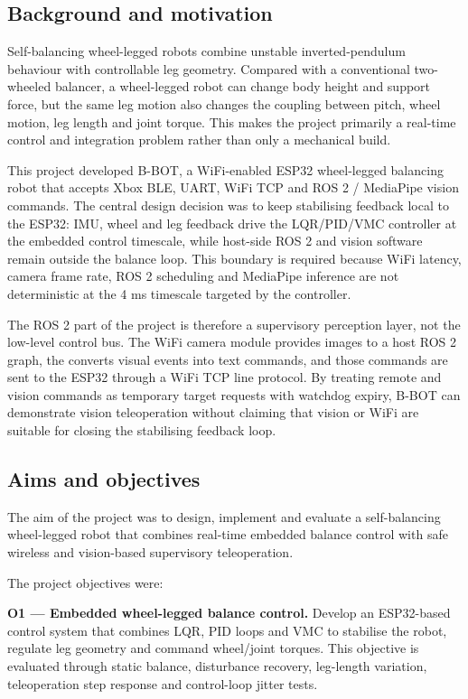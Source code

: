 \documentclass[12pt, a4paper]{article}
\begin{document}
\subsection{Background and motivation}

Self-balancing wheel-legged robots combine unstable inverted-pendulum behaviour with controllable leg geometry. Compared with a conventional two-wheeled balancer, a wheel-legged robot can change body height and support force, but the same leg motion also changes the coupling between pitch, wheel motion, leg length and joint torque. This makes the project primarily a real-time control and integration problem rather than only a mechanical build.

This project developed B-BOT, a WiFi-enabled ESP32 wheel-legged balancing robot that accepts Xbox BLE, UART, WiFi TCP and ROS 2 / MediaPipe vision commands. The central design decision was to keep stabilising feedback local to the ESP32: IMU, wheel and leg feedback drive the LQR/PID/VMC controller at the embedded control timescale, while host-side ROS 2 and vision software remain outside the balance loop. This boundary is required because WiFi latency, camera frame rate, ROS 2 scheduling and MediaPipe inference are not deterministic at the 4 ms timescale targeted by the controller.

The ROS 2 part of the project is therefore a supervisory perception layer, not the low-level control bus. The WiFi camera module provides images to a host ROS 2 graph, the \texttt{} converts visual events into text commands, and those commands are sent to the ESP32 through a WiFi TCP line protocol. By treating remote and vision commands as temporary target requests with watchdog expiry, B-BOT can demonstrate vision teleoperation without claiming that vision or WiFi are suitable for closing the stabilising feedback loop.

\subsection{Aims and objectives}

The aim of the project was to design, implement and evaluate a self-balancing wheel-legged robot that combines real-time embedded balance control with safe wireless and vision-based supervisory teleoperation.

The project objectives were:

\textbf{O1 — Embedded wheel-legged balance control.}
Develop an ESP32-based control system that combines LQR, PID loops and VMC to stabilise the robot, regulate leg geometry and command wheel/joint torques. This objective is evaluated through static balance, disturbance recovery, leg-length variation, teleoperation step response and control-loop jitter tests.
\end{document}
